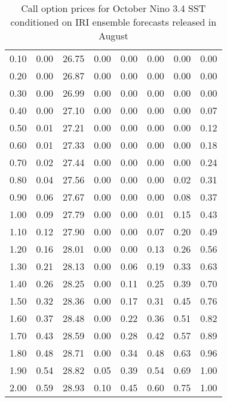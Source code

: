 \begin{table*}[ht]
\begin{tabular}{rrrrrrrr}
  0.10 & 0.00 & 26.75 & 0.00 & 0.00 & 0.00 & 0.00 & 0.00 \\ 
  0.20 & 0.00 & 26.87 & 0.00 & 0.00 & 0.00 & 0.00 & 0.00 \\ 
  0.30 & 0.00 & 26.99 & 0.00 & 0.00 & 0.00 & 0.00 & 0.00 \\ 
  0.40 & 0.00 & 27.10 & 0.00 & 0.00 & 0.00 & 0.00 & 0.07 \\ 
  0.50 & 0.01 & 27.21 & 0.00 & 0.00 & 0.00 & 0.00 & 0.12 \\ 
  0.60 & 0.01 & 27.33 & 0.00 & 0.00 & 0.00 & 0.00 & 0.18 \\ 
  0.70 & 0.02 & 27.44 & 0.00 & 0.00 & 0.00 & 0.00 & 0.24 \\ 
  0.80 & 0.04 & 27.56 & 0.00 & 0.00 & 0.00 & 0.02 & 0.31 \\ 
  0.90 & 0.06 & 27.67 & 0.00 & 0.00 & 0.00 & 0.08 & 0.37 \\ 
  1.00 & 0.09 & 27.79 & 0.00 & 0.00 & 0.01 & 0.15 & 0.43 \\ 
  1.10 & 0.12 & 27.90 & 0.00 & 0.00 & 0.07 & 0.20 & 0.49 \\ 
  1.20 & 0.16 & 28.01 & 0.00 & 0.00 & 0.13 & 0.26 & 0.56 \\ 
  1.30 & 0.21 & 28.13 & 0.00 & 0.06 & 0.19 & 0.33 & 0.63 \\ 
  1.40 & 0.26 & 28.25 & 0.00 & 0.11 & 0.25 & 0.39 & 0.70 \\ 
  1.50 & 0.32 & 28.36 & 0.00 & 0.17 & 0.31 & 0.45 & 0.76 \\ 
  1.60 & 0.37 & 28.48 & 0.00 & 0.22 & 0.36 & 0.51 & 0.82 \\ 
  1.70 & 0.43 & 28.59 & 0.00 & 0.28 & 0.42 & 0.57 & 0.89 \\ 
  1.80 & 0.48 & 28.71 & 0.00 & 0.34 & 0.48 & 0.63 & 0.96 \\ 
  1.90 & 0.54 & 28.82 & 0.05 & 0.39 & 0.54 & 0.69 & 1.00 \\ 
  2.00 & 0.59 & 28.93 & 0.10 & 0.45 & 0.60 & 0.75 & 1.00 \\ 
   \hline
\end{tabular}
\caption{Call option prices for October Nino 3.4 SST conditioned on IRI ensemble forecasts released in August} 
\end{table*}

